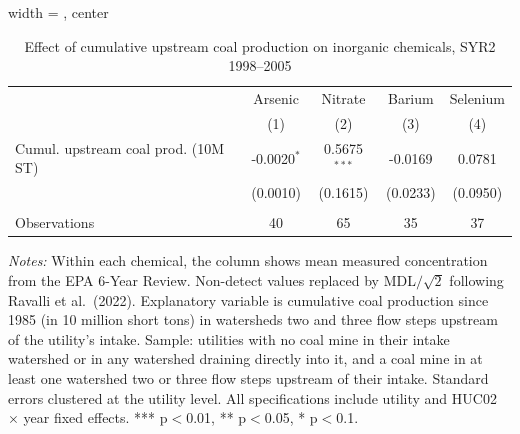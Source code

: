 \begin{table}[htbp]
   
   \caption{\label{tab:6yr_huc02fe_inorg_ravalli_2005_step23} Effect of cumulative upstream coal production on inorganic chemicals, SYR2 1998--2005}
   \bigskip
   
   \centering
   
\begin{adjustbox}{width = \textwidth, center}
   \begin{tabular}{lcccc}
      \toprule
       & Arsenic & Nitrate & Barium & Selenium \\
                                          & (1)           & (2)            & (3)      & (4)\\  
      \midrule 
      Cumul. upstream coal prod. (10M ST) & -0.0020$^{*}$ & 0.5675$^{***}$ & -0.0169  & 0.0781\\   
                                          & (0.0010)      & (0.1615)       & (0.0233) & (0.0950)\\   
       \\
      Observations                        & 40            & 65             & 35       & 37\\  
      \bottomrule
   \end{tabular}
\end{adjustbox}
   
   {\tiny\linespread{1}\selectfont \par \raggedright 
   \textit{Notes:} Within each chemical, the column shows mean measured concentration from the EPA 6-Year Review. Non-detect values replaced by MDL$/\sqrt{2}$ following Ravalli et al.~(2022). Explanatory variable is cumulative coal production since 1985 (in 10 million short tons) in watersheds two and three flow steps upstream of the utility's intake. Sample: utilities with no coal mine in their intake watershed or in any watershed draining directly into it, and a coal mine in at least one watershed two or three flow steps upstream of their intake. Standard errors clustered at the utility level. All specifications include utility and HUC02 $\times$ year fixed effects. *** p$<$0.01, ** p$<$0.05, * p$<$0.1.}
   
\end{table}



